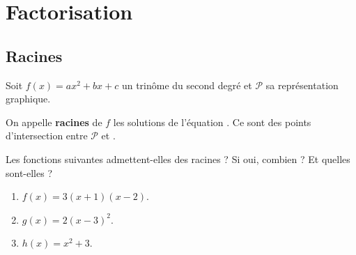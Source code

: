 \documentclass{beamer}
\begin{document}

 
 
 \section{Factorisation}
 
 \subsection{Racines}
 
 \begin{frame}
 \begin{definition}
    Soit $f(x)=ax^2+bx+c$ un trinôme du second degré et $\mathcal{P}$ sa représentation 
    graphique.
    
    On appelle \textbf{racines} de $f$ les solutions de l'équation .
    Ce sont  des points d'intersection entre $\mathcal{P}$ 
    et .
    
  \end{definition}
\end{frame}
  
  \begin{frame}
  \begin{example}
    Les fonctions suivantes admettent-elles des racines ? Si oui, combien ? 
    Et quelles sont-elles ?
    \begin{enumerate}
     \item $f(x)=3(x+1)(x-2)$. 
     \item $g(x)=2(x-3)^2$.
     \item $h(x)=x^2+3$.
    \end{enumerate}
  \end{example}
\end{frame}
\end{document}
